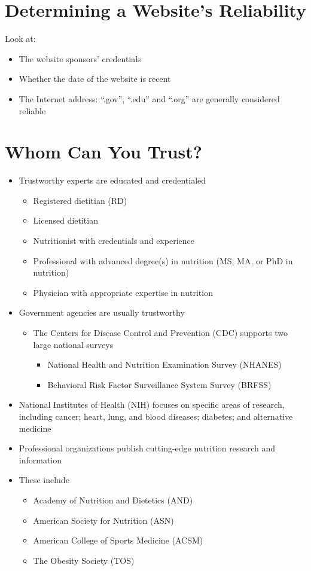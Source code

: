 \documentclass[title={Chapter 1}]{fdsn201notes}
\begin{document}
\section{Determining a Website's Reliability}\label{sec:determining-a-website's-reliability}
Look at:
\begin{itemize}
	\item The website sponsors' credentials
	\item Whether the date of the website is recent
	\item The Internet address: ``.gov'', ``.edu'' and ``.org'' are generally considered reliable
\end{itemize}

\section{Whom Can You Trust?}\label{sec:whom-can-you-trust?}
\begin{itemize}
	\item Trustworthy experts are educated and credentialed
	\begin{itemize}
		\item Registered dietitian (RD)
		\item Licensed dietitian
		\item Nutritionist with credentials and experience
		\item Professional with advanced degree(s) in nutrition (MS, MA, or PhD in nutrition)
		\item Physician with appropriate expertise in nutrition
	\end{itemize}
	\item Government agencies are usually trustworthy
	\begin{itemize}
		\item The Centers for Disease Control and Prevention (CDC) supports two large national surveys
		\begin{itemize}
			\item National Health and Nutrition Examination Survey (NHANES)
			\item Behavioral Risk Factor Surveillance System Survey (BRFSS)
		\end{itemize}
	\end{itemize}
	\item National Institutes of Health (NIH) focuses on specific areas of research, including cancer; heart, lung, and blood diseases; diabetes; and alternative medicine
	\item Professional organizations publish cutting-edge nutrition research and information
	\item These include
	\begin{itemize}
		\item Academy of Nutrition and Dietetics (AND)
		\item American Society for Nutrition (ASN)
		\item American College of Sports Medicine (ACSM)
		\item The Obesity Society (TOS)
	\end{itemize}
\end{itemize}
\end{document}
